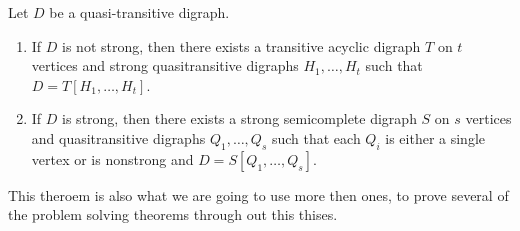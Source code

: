 \begin{thm}\cite{bangJGT85}
    Let $D$ be a quasi-transitive digraph.
    \begin{enumerate}
        \item If $D$ is not strong, then there exists a transitive acyclic digraph $T$ on $t$ vertices and strong quasitransitive digraphs $H_1,\dots,H_t$ such that $D=T[H_1,\dots,H_t]$.
        \item If $D$ is strong, then there exists a strong semicomplete digraph $S$ on $s$ vertices and quasitransitive digraphs $Q_1,\dots ,Q_s$ such that each $Q_i$ is either a single vertex or is nonstrong and $D=S[Q_1,\dots,Q_s]$.
    \end{enumerate}
    \label{thm:quasidecom}
\end{thm}
This theroem is also what we are going to use more then ones, to prove several of the problem solving theorems through out this thises.
